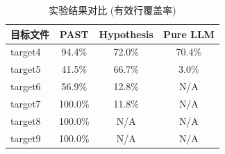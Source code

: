 \begin{table}[htbp]
\centering
\caption{实验结果对比 (有效行覆盖率)}
\begin{tabular}{|l|c|c|c|}
\hline
目标文件 & PAST & Hypothesis & Pure LLM \\
\hline
target4 & 94.4\% & 72.0\% & 70.4\% \\
\hline
target5 & 41.5\% & 66.7\% & 3.0\% \\
\hline
target6 & 56.9\% & 12.8\% & N/A \\
\hline
target7 & 100.0\% & 11.8\% & N/A \\
\hline
target8 & 100.0\% & N/A & N/A \\
\hline
target9 & 100.0\% & N/A & N/A \\
\hline
\end{tabular}
\end{table}
